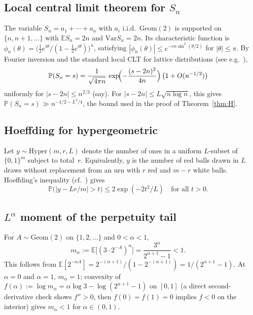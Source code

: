 \documentclass[11pt,a4paper]{amsart}
\theoremstyle{plain}
\theoremstyle{definition}
\newcommand{\E}{\mathbb{E}}
\newcommand{\PP}{\mathbb{P}}
\newcommand{\Geom}{\mathrm{Geom}}
\newcommand{\Hyper}{\mathrm{Hyper}}
\newcommand{\Var}{\mathrm{Var}}
\begin{document}
\subsection{Local central limit theorem for $S_n$}
The variable $S_n=a_1+\cdots+a_n$ with $a_i$ i.i.d.\ $\Geom(2)$ is
supported on $\{n,n+1,\dots\}$ with $\E S_n=2n$ and $\Var S_n=2n$.
Its characteristic function is
$\phi_n(\theta)=\bigl(\tfrac12 e^{i\theta}/(1-\tfrac12 e^{i\theta})\bigr)^n$,
satisfying $|\phi_n(\theta)|\le e^{-cn\sin^2(\theta/2)}$ for $|\theta|\le\pi$.
By Fourier inversion and the standard local CLT for lattice distributions
(see e.g.~\cite[Theorem 2.5.2]{LPW}),
\begin{equation}\label{eq:LCLTapp}
\PP(S_n=s)=\frac{1}{\sqrt{4\pi n}}\,\exp\!\Bigl(-\frac{(s-2n)^2}{4n}\Bigr)\,\bigl(1+O(n^{-1/2})\bigr)
\end{equation}
uniformly for $|s-2n|\le n^{2/3}$ (say).
For $|s-2n|\le L\sqrt{n\log n}$, this gives
$\PP(S_n=s)\gg n^{-1/2-L^2/4}$, the bound used in the proof of
Theorem~\ref{thm:H}.

\subsection{Hoeffding for hypergeometric}
Let $y\sim\Hyper(m,r,L)$ denote the number of ones in a uniform $L$-subset
of $\{0,1\}^m$ subject to total~$r$.
Equivalently, $y$ is the number of red balls drawn in $L$ draws without
replacement from an urn with $r$ red and $m-r$ white balls.
Hoeffding's inequality (cf.~\cite[Theorem 12.4]{LPW}) gives
\begin{equation}\label{eq:hoeffdingapp}
\PP\bigl(|y-Lr/m|>t\bigr)\le 2\exp(-2t^2/L)\quad\text{for all }t>0.
\end{equation}

\subsection{$L^\alpha$ moment of the perpetuity tail}\label{app:Lalpha}
For $A\sim\Geom(2)$ on $\{1,2,\dots\}$ and $0<\alpha<1$,
\begin{equation}\label{eq:mqapp}
m_\alpha:=\E\bigl[(3\cdot 2^{-A})^\alpha\bigr]=\frac{3^\alpha}{2^{\alpha+1}-1}<1.
\end{equation}
This follows from $\E[2^{-\alpha A}]=2^{-(\alpha+1)}/(1-2^{-(\alpha+1)})=1/(2^{\alpha+1}-1)$.
At $\alpha=0$ and $\alpha=1$, $m_\alpha=1$; convexity of
$f(\alpha):=\log m_\alpha=\alpha\log 3-\log(2^{\alpha+1}-1)$ on $[0,1]$ (a direct
second-derivative check shows $f''>0$, then $f(0)=f(1)=0$ implies $f<0$ on the
interior) gives $m_\alpha<1$ for $\alpha\in(0,1)$.
\end{document}
